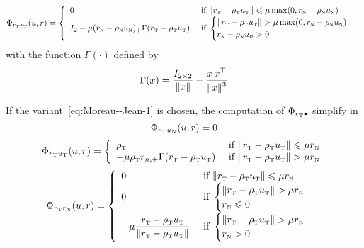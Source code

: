 \begin{equation}
  \label{eq:Phi-AC-II-rtrt}
  \Phi_{r_\t r_\t}(u,r) =
  \left\{
    \begin{array}{ll}
      0 & \text{ if }  \|r_{\t}  - \rho_{\t} u_{\t}\| \leq  \mu \max (0 ,r_{\n} - \rho_{\n} u_\n )  \\
      I_2-\mu(r_{\n} - \rho_{\n}u_\n )_+ \Gamma(r_{\t} - \rho_{\t} u_{\t})    &  \text{ if }
      \begin{cases}
        \|r_{\t}  - \rho_{\t} u_{\t}\| >  \mu \max (0 ,r_{\n} - \rho_{\n} u_\n )  \\
        r_{\n} - \rho_{\n} u_n > 0
      \end{cases} \\
    \end{array}\right.
\end{equation}
with
 the function $\Gamma(\cdot)$  defined by
\begin{equation}
  \label{eq:AC-L12}
  \Gamma(x) = \Frac{I_{2\times 2}}{\|x\|} - \Frac{x\,x^\top}{\|x\|^3}
\end{equation}

If the variant~\eqref{eq:Moreau--Jean-1} is chosen, the computation of $\Phi_{r_{\hbox{\tiny{T}}} \bullet}$  simplify in
\begin{equation}
  \label{eq:Phi-CKPS-II-rtun}
  \Phi_{r_\t u_\n}(u,r) =   0
\end{equation}
\begin{equation}
  \label{eq:Phi-CKPS-II-rtut}
  \Phi_{r_\t u_\t}(u,r) =
  \left\{
    \begin{array}{ll}
      \rho_{\t} & \text{ if }  \|r_{\t}  - \rho_{\t} u_{\t}\| \leq  \mu r_\n  \\
      -\mu\rho_\t r_{n,+} \Gamma(r_\t-\rho_\t u_\t) & \text{ if }
      \|r_{\t}  - \rho_{\t} u_{\t}\| >  \mu r_\n  \\
    \end{array}\right.
\end{equation}
\begin{equation}
  \label{eq:Phi-CKPS-II-rtrn}
  \Phi_{r_\t r_\n}(u,r) =
  \left\{
    \begin{array}{ll}
      0 & \text{ if }  \|r_{\t}  - \rho_{\t} u_{\t}\| \leq  \mu r_{\n}  \\
      0 & \text{ if }
      \begin{cases}
        \|r_{\t}  - \rho_{\t} u_{\t}\| >  \mu r_n  \\
        r_{\n} \leq 0
      \end{cases} \\
       -\mu  \Frac{r_{\t} - \rho_{\t} u_{\t} }{ \| r_{\t} - \rho_{\t} u_{\t}\| }  &  \text{ if }
      \begin{cases}
        \|r_{\t}  - \rho_{\t} u_{\t}\| >  \mu r_n  \\
        r_{\n}  > 0
      \end{cases} \\
    \end{array}\right.
\end{equation}

